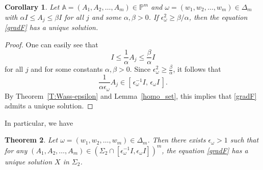 \documentclass[12pt,reqno]{amsart}
\newtheorem{theorem}{Theorem}[section]
\newtheorem{corollary}[theorem]{Corollary}
\newtheorem{Definition}[theorem]{Definition}
\newenvironment{definition}{\begin{Definition}\begin{em}}{\end{em}\end{Definition}}
\begin{document}
\begin{corollary}\label{corol_P}
Let $\mathbb{A } =(A_1, A_2, \ldots, A_m) \in \mathbb{P}^{m}$ and $\omega = (w_{1}, w_{2}, \dots, w_{m}) \in \Delta_{m}$ with $\alpha I \leq A_j \leq \beta I$ for all $j$ and some $\alpha, \beta > 0$. If $\epsilon_{\omega}^2 \geq \beta / \alpha$, then the equation \eqref{gradF} has a unique solution.
\end{corollary}

\begin{proof}
One can easily see that
\[
I \leq \frac{1}{\alpha} A_j \leq \frac{\beta}{\alpha} I
\]
for all \( j \) and for some constants \( \alpha, \beta > 0 \).
Since \( \epsilon_{\omega}^2 \geq \frac{\beta}{\alpha} \), it follows that
\[
\frac{1}{\alpha \epsilon_{\omega}} A_j \in
\left[ \, \epsilon_{\omega}^{-1} I,\, \epsilon_{\omega} I \, \right].
\]
By Theorem~\ref{T:Wass-epsilon} and Lemma~\ref{homo_set},
this implies that \eqref{gradF} admits a unique solution.
\end{proof}




In particular, we have


\begin{theorem}
Let  $\omega = (w_{1}, w_{2}, \dots, w_{m}) \in \Delta_{m}$. Then there exists $\epsilon_{\omega} > 1$ such that for any  $(A_1, A_2, \ldots, A_m) \in (\Sigma_2 \cap [\epsilon_{\omega}^{-1} I, \epsilon_{\omega} I])^m$, the equation \eqref{gradF} has a unique solution $X$ in $\Sigma_2$.
\end{theorem}
\end{document}
